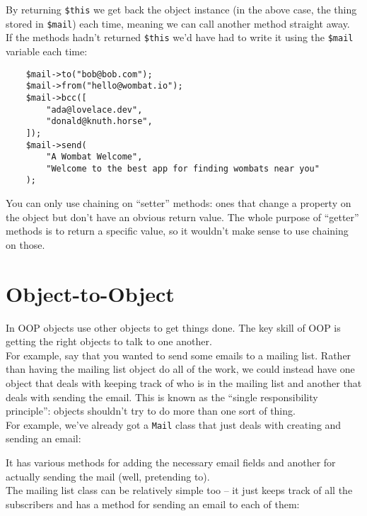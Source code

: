 By returning \texttt{\$this} we get back the object instance (in the above case, the thing stored in \texttt{\$mail}) each time, meaning we can call another method straight away.
\\

If the methods hadn't returned \texttt{\$this} we'd have had to write it using the \texttt{\$mail} variable each time:

\begin{verbatim}
    $mail->to("bob@bob.com");
    $mail->from("hello@wombat.io");
    $mail->bcc([
        "ada@lovelace.dev",
        "donald@knuth.horse",
    ]);
    $mail->send(
        "A Wombat Welcome",
        "Welcome to the best app for finding wombats near you"
    );
\end{verbatim}

You can only use chaining on ``setter'' methods: ones that change a property on the object but don't have an obvious return value. The whole purpose of ``getter'' methods is to return a specific value, so it wouldn't make sense to use chaining on those.



\section{Object-to-Object}

In OOP objects use other objects to get things done. The key skill of OOP is getting the right objects to talk to one another.
\\

For example, say that you wanted to send some emails to a mailing list. Rather than having the mailing list object do all of the work, we could instead have one object that deals with keeping track of who is in the mailing list and another that deals with sending the email. This is known as the ``single responsibility principle'': objects shouldn't try to do more than one sort of thing.
\\

For example, we've already got a \texttt{Mail} class that just deals with creating and sending an email:


It has various methods for adding the necessary email fields and another for actually sending the mail (well, pretending to).
\\

The mailing list class can be relatively simple too – it just keeps track of all the subscribers and has a method for sending an email to each of them:

